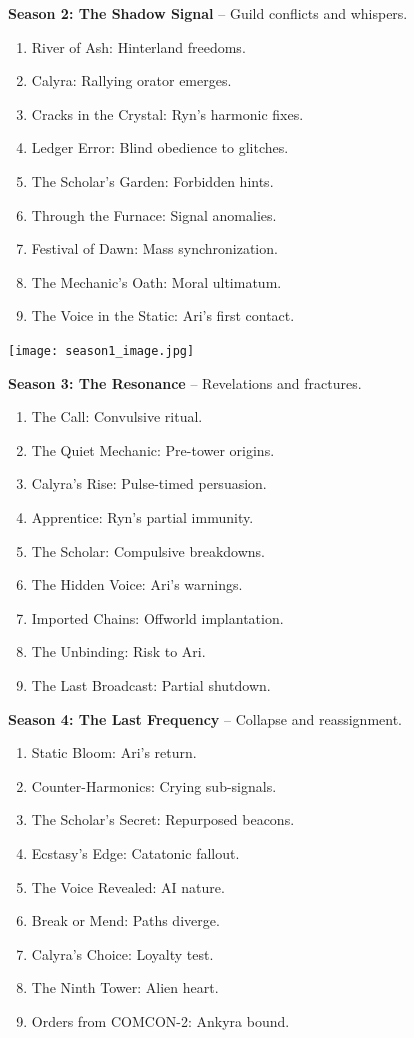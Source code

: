\documentclass[10pt,letterpaper]{article}
\begin{document}
\begin{paracol}{2}
\textbf{Season 2: The Shadow Signal} – Guild conflicts and whispers.
\begin{enumerate}[leftmargin=0pt,itemsep=0pt]
    \item River of Ash: Hinterland freedoms.
    \item Calyra: Rallying orator emerges.
    \item Cracks in the Crystal: Ryn's harmonic fixes.
    \item Ledger Error: Blind obedience to glitches.
    \item The Scholar’s Garden: Forbidden hints.
    \item Through the Furnace: Signal anomalies.
    \item Festival of Dawn: Mass synchronization.
    \item The Mechanic’s Oath: Moral ultimatum.
    \item The Voice in the Static: Ari's first contact.
\end{enumerate}

\begin{center}
\texttt{[image: season1\_image.jpg]} %
\end{center}

\textbf{Season 3: The Resonance} – Revelations and fractures.
\begin{enumerate}[leftmargin=0pt,itemsep=0pt]
    \item The Call: Convulsive ritual.
    \item The Quiet Mechanic: Pre-tower origins.
    \item Calyra’s Rise: Pulse-timed persuasion.
    \item Apprentice: Ryn's partial immunity.
    \item The Scholar: Compulsive breakdowns.
    \item The Hidden Voice: Ari's warnings.
    \item Imported Chains: Offworld implantation.
    \item The Unbinding: Risk to Ari.
    \item The Last Broadcast: Partial shutdown.
\end{enumerate}

\textbf{Season 4: The Last Frequency} – Collapse and reassignment.
\begin{enumerate}[leftmargin=0pt,itemsep=0pt]
    \item Static Bloom: Ari's return.
    \item Counter-Harmonics: Crying sub-signals.
    \item The Scholar’s Secret: Repurposed beacons.
    \item Ecstasy’s Edge: Catatonic fallout.
    \item The Voice Revealed: AI nature.
    \item Break or Mend: Paths diverge.
    \item Calyra’s Choice: Loyalty test.
    \item The Ninth Tower: Alien heart.
    \item Orders from COMCON-2: Ankyra bound.
\end{enumerate}


\end{paracol}
\end{document}
